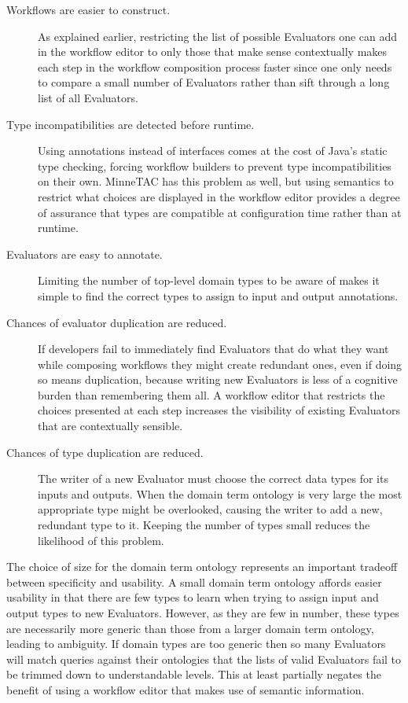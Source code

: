 \documentclass{article}
\begin{document}
\begin{description}

\item[Workflows are easier to construct.]
As explained earlier, restricting the list of possible Evaluators one can add in the workflow editor to only those that make sense contextually makes each step in the workflow composition process faster since one only needs to compare a small number of Evaluators rather than sift through a long list of all Evaluators.

\item[Type incompatibilities are detected before runtime.]
Using annotations instead of interfaces comes at the cost of Java's static type checking, forcing workflow builders to prevent type incompatibilities on their own.
MinneTAC has this problem as well, but using semantics to restrict what choices are displayed in the workflow editor provides a degree of assurance that types are compatible at configuration time rather than at runtime.

\item[Evaluators are easy to annotate.]
Limiting the number of top-level domain types to be aware of makes it simple to find the correct types to assign to input and output annotations.

\item[Chances of evaluator duplication are reduced.]
If developers fail to immediately find Evaluators that do what they want while composing workflows they might create redundant ones, even if doing so means duplication, because writing new Evaluators is less of a cognitive burden than remembering them all.
A workflow editor that restricts the choices presented at each step increases the visibility of existing Evaluators that are contextually sensible.

\item[Chances of type duplication are reduced.]
The writer of a new Evaluator must choose the correct data types for its inputs and outputs.
When the domain term ontology is very large the most appropriate type might be overlooked, causing the writer to add a new, redundant type to it.
Keeping the number of types small reduces the likelihood of this problem.

\end{description}

The choice of size for the domain term ontology represents an important tradeoff between specificity and usability.
A small domain term ontology affords easier usability in that there are few types to learn when trying to assign input and output types to new Evaluators.
However, as they are few in number, these types are necessarily more generic than those from a larger domain term ontology, leading to ambiguity.
If domain types are too generic then so many Evaluators will match queries against their ontologies that the lists of valid Evaluators fail to be trimmed down to understandable levels.
This at least partially negates the benefit of using a workflow editor that makes use of semantic information.
\end{document}
